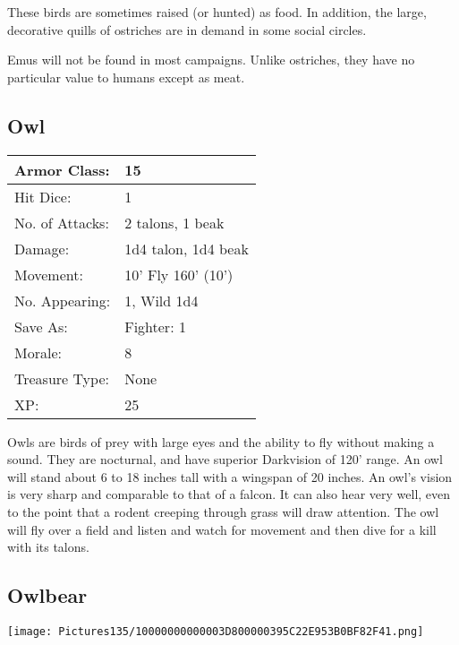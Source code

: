 \documentclass[a4paper,twoside,openany,10pt]{book}
\begin{document}
\begin{multicols}{2}
These birds are sometimes raised (or hunted) as food. In addition, the large, decorative quills of ostriches are in demand in some social
circles.

Emus will not be found in most campaigns. Unlike ostriches, they have no particular value to humans except as meat.

\subsection*{Owl}\label{owl}

\begin{tabularx}{0.50\textwidth}{@{}lX@{}}
Armor Class: & 15 \\\hline
Hit Dice: & 1 \\\hline
No. of Attacks: & 2 talons, 1 beak \\\hline
Damage: & 1d4 talon, 1d4 beak \\\hline
Movement: & 10' Fly 160' (10') \\\hline
No. Appearing: & 1, Wild 1d4 \\\hline
Save As: & Fighter: 1 \\\hline
Morale: & 8 \\\hline
Treasure Type: & None \\\hline
XP: & 25 \\\hline
\end{tabularx}\medskip

Owls are birds of prey with large eyes and the ability to fly without making a sound. They are nocturnal, and have superior Darkvision of 120' range. An owl will stand about 6 to 18 inches tall with a wingspan of 20 inches. An owl's vision is very sharp and comparable to that of a falcon. It can also hear very well, even to the point that a rodent creeping through grass will draw attention. The owl will fly over a field and listen and watch for movement and then dive for a kill with its talons.

\subsection*{Owlbear}\label{owlbear}


\begin{center} \texttt{[image: Pictures135/10000000000003D800000395C22E953B0BF82F41.png]} \end{center}


\end{multicols}
\end{document}
